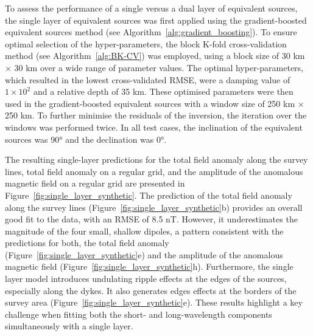 To assess the performance of a single versus a dual layer of equivalent sources, the single layer of equivalent sources was first applied using the gradient-boosted equivalent sources method (see Algorithm~\ref{alg:gradient_boosting}). To ensure optimal selection of the hyper-parameters, the block K-fold cross-validation method (see Algorithm~\ref{alg:BK-CV}) was employed, using a block size of 30 km $\times$ 30 km over a wide range of parameter values. The optimal hyper-parameters, which resulted in the lowest cross-validated RMSE, were a damping value of $1 \times 10^{2}$ and a relative depth of 35 km. These optimised parameters were then used in the gradient-boosted equivalent sources with a window size of 250 km $\times$ 250 km. To further minimise the residuals of the inversion, the iteration over the windows was performed twice.
In all test cases, the inclination of the equivalent sources was \ang{90} and the declination was \ang{0}.

The resulting single-layer predictions for the total field anomaly along the survey lines, total field anomaly on a regular grid, and the amplitude of the anomalous magnetic field on a regular grid are presented in Figure~\ref{fig:single_layer_synthetic}. The prediction of the total field anomaly along the survey lines (Figure~\ref{fig:single_layer_synthetic}b) provides an overall good fit to the data, with an RMSE of 8.5 nT. However, it underestimates the magnitude of the four small, shallow dipoles, a pattern consistent with the predictions for both, the total field anomaly (Figure~\ref{fig:single_layer_synthetic}e) and the amplitude of the anomalous magnetic field (Figure~\ref{fig:single_layer_synthetic}h). Furthermore, the single layer model introduces undulating ripple effects at the edges of the sources, especially along the dykes. It also generates edges effects at the borders of the survey area (Figure~\ref{fig:single_layer_synthetic}e). These results highlight a key challenge when fitting both the short- and long-wavelength components simultaneously with a single layer.

